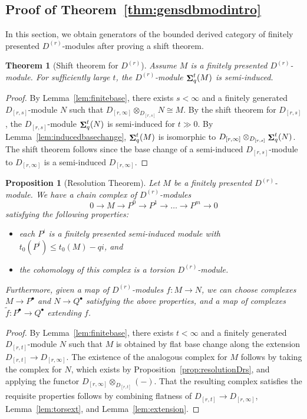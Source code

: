 \documentclass[12pt]{amsart}
\DeclareMathOperator{\Sh}{\bf{\Sigma}}
\newcommand{\Dr}{D^{(r)}}
\newcommand{\Drs}{D_{[r,s]}}
\newcommand{\Drinfty}{D_{[r,\infty]}}
\newcommand{\mShq}{\Sh_{q}}
\numberwithin{equation}{section}
\newtheorem{theorem}[equation]{Theorem}
\newtheorem{proposition}[equation]{Proposition}
\theoremstyle{definition}
\theoremstyle{plain}
\begin{document}
\subsection{Proof of Theorem~\ref{thm:gensdbmodintro}}\label{ss:proofs}
In this section, we obtain generators of the bounded derived category of finitely presented $\Dr$-modules after proving a shift theorem.


\begin{theorem}[Shift theorem for $\Dr$]\label{thm:shiftDr}
   Assume $M$ is a finitely presented $\Dr$-module. For sufficiently large $t$, the $\Dr$-module $\mShq^t(M)$ is semi-induced.
\end{theorem}
\begin{proof}
    By Lemma~\ref{lem:finitebase}, there exists $s < \infty$ and a finitely generated $\Drs$-module $N$ such that $\Drinfty \otimes_{\Drs} N \cong M$. By the shift theorem for $\Drs$, the $\Drs$-module $\mShq^t(N)$ is semi-induced for $t \gg 0$. By Lemma~\ref{lem:inducedbasechange}, $\mShq^t(M)$ is isomorphic to $\Drinfty \otimes_{\Drs} \mShq^t(N)$. The shift theorem  follows since the base change of a semi-induced $\Drs$-module to $\Drinfty$ is a semi-induced $\Drinfty$.
\end{proof}


\begin{proposition}[Resolution Theorem]\label{prop:resolutionDr}
Let $M$ be a finitely presented $\Dr$-module. We have a chain complex of $\Dr$-modules
\begin{displaymath}
0 \to M \to P^0 \to P^1 \to \ldots \to P^m \to 0
\end{displaymath}
satisfying the following properties:
\begin{itemize}
\item each $P^i$ is a finitely presented semi-induced module with $t_0(P^i) \le t_0(M) - qi$, and
\item the cohomology of this complex is a torsion $\Dr$-module.
\end{itemize}
{Furthermore, given a map of $\Dr$-modules $f \colon M \to N$, we can choose complexes $M \to P^{\bullet}$ and $N \to Q^{\bullet}$ satisfying the above properties, and a map of complexes $\tilde{f}\colon P^{\bullet} \to Q^{\bullet}$ extending $f$.}
\end{proposition}
\begin{proof}
By Lemma~\ref{lem:finitebase}, there exists $t < \infty$ and a finitely generated $D_{[r, t]}$-module $N$ such that $M$ is obtained by flat base change along the extension $D_{[r, t]} \to \Drinfty$. The existence of the analogous complex for $M$ follows by taking the complex for $N$, which exists by Proposition~\ref{prop:resolutionDrs}, and applying the functor $\Drinfty \otimes_{D_{[r,t]}} (-)$. That the resulting complex satisfies the requisite properties follows by combining flatness of $D_{[r, t]} \to \Drinfty$, Lemma~\ref{lem:torsext}, and Lemma~\ref{lem:extension}.
\end{proof}
\end{document}

